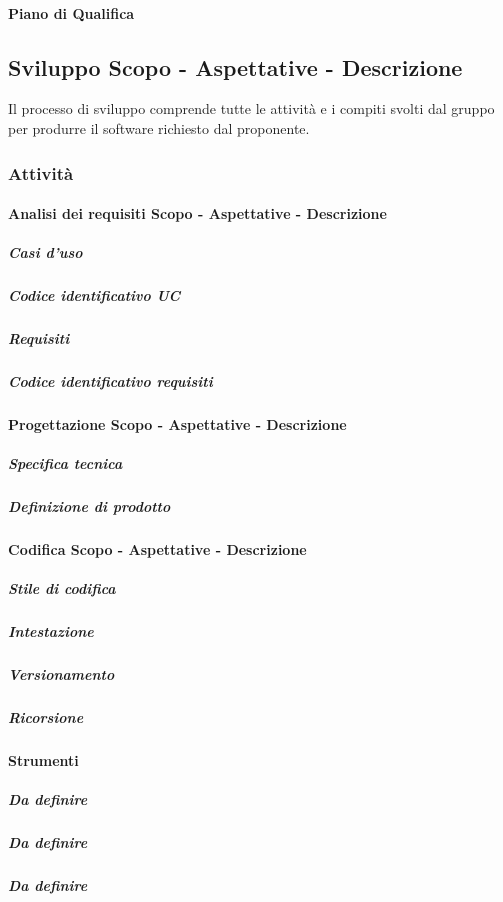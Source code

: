 \paragraph{Piano di Qualifica}

\subsection{Sviluppo Scopo - Aspettative - Descrizione}
Il processo di sviluppo comprende tutte le attività e i compiti svolti dal gruppo per produrre il software richiesto dal proponente.

\subsubsection{Attività}
\paragraph{Analisi dei requisiti Scopo - Aspettative - Descrizione}
\subparagraph{Casi d'uso}
\subparagraph{Codice identificativo UC}
\subparagraph{Requisiti}
\subparagraph{Codice identificativo requisiti}
\paragraph{Progettazione Scopo - Aspettative - Descrizione}
\subparagraph{Specifica tecnica}
\subparagraph{Definizione di prodotto}
\paragraph{Codifica Scopo - Aspettative - Descrizione}
\subparagraph{Stile di codifica}
\subparagraph{Intestazione}
\subparagraph{Versionamento}
\subparagraph{Ricorsione}
\paragraph{Strumenti}
\subparagraph{Da definire}
\subparagraph{Da definire}
\subparagraph{Da definire}



